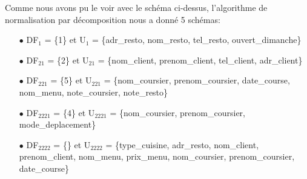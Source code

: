 \documentclass[french]{article}
\begin{document}
            \begin{landscape}
                \thispagestyle{empty}
            \end{landscape}
            \newpage
            
            Comme nous avons pu le voir avec le schéma ci-dessus, l'algorithme de normalisation par décomposition nous a donné 5 schémas:\bigskip
            \begin{enumerate}
                \item[$\bullet$] DF$_{1}$ = \{1\} et U$_{1}$ = \{adr\_resto, nom\_resto, tel\_resto, ouvert\_dimanche\}
                \item[$\bullet$] DF$_{21}$ = \{2\} et U$_{21}$ = \{nom\_client, prenom\_client, tel\_client, adr\_client\}
                \item[$\bullet$] DF$_{221}$ = \{5\} et U$_{221}$ = \{nom\_coursier, prenom\_coursier, date\_course, nom\_menu, \newline note\_coursier, note\_resto\}
                \item[$\bullet$] DF$_{2221}$ = \{4\} et U$_{2221}$ = \{nom\_coursier, prenom\_coursier, mode\_deplacement\}
                \item[$\bullet$] DF$_{2222}$ = \{\} et U$_{2222}$ = \{type\_cuisine, adr\_resto, nom\_client, prenom\_client, nom\_menu, prix\_menu, nom\_coursier, prenom\_coursier, date\_course\}\bigskip
            \end{enumerate}
            
\end{document}
